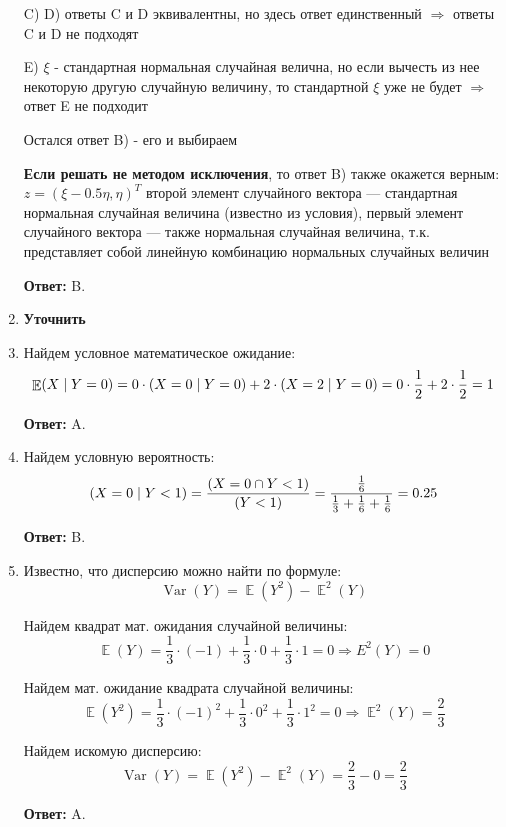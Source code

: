 \documentclass[a4paper]{article} %
\DeclareMathOperator{\Var}{Var}
\DeclareMathOperator{\E}{\mathbb{E}}
\let\P\relax
\DeclareMathOperator{\P}{\mathbb{P}}
\begin{document}
\begin{enumerate}
    C) D)  ответы C и D эквивалентны, но здесь ответ единственный  $\Rightarrow$ ответы C и D не подходят
    
    E) $\xi$ - стандартная нормальная случайная велична, но если вычесть из нее некоторую другую случайную величину, то стандартной $\xi$ уже не будет $\Rightarrow$ ответ E не подходит
    
    Остался ответ B) - его и выбираем
    
    \textbf{Если решать не методом исключения}, то ответ B) также окажется верным:
    $z = (\xi-0.5\eta, \eta)^T$ второй элемент случайного вектора — стандартная нормальная случайная величина (известно из условия), первый элемент случайного вектора — также нормальная случайная величина, т.к. представляет собой линейную комбинацию нормальных случайных величин
    
    \textbf{Ответ:} B.
    
    
    \item
    \textbf{Уточнить}

    
    \item
    Найдем условное математическое ожидание:
    \[\E(X \mid Y=0) = 0 \cdot \P(X=0 \mid Y=0) + 2 \cdot \P(X=2 \mid Y=0) = 0 \cdot \frac{1}{2} + 2 \cdot \frac{1}{2} = 1\]
    
    \textbf{Ответ:} A.
    
    
    \item
    Найдем условную вероятность:
    \[\P(X=0 \mid Y<1) = \frac{\P(X=0 \cap Y<1)}{\P(Y<1)} = \frac{\frac{1}{6}}{\frac{1}{3}+\frac{1}{6}+\frac{1}{6}} = 0.25\]
    
    \textbf{Ответ:} B.
    
    
    \item
    Известно, что дисперсию можно найти по формуле:
    \[\Var(Y) = \E(Y^2) - \E^2(Y)\]
    
    Найдем квадрат мат. ожидания случайной величины:
    \[\E(Y) = \frac{1}{3} \cdot (-1) + \frac{1}{3} \cdot 0 + \frac{1}{3} \cdot 1 = 0 \Rightarrow E^2(Y)=0\]
    
    Найдем мат. ожидание квадрата случайной величины:
    \[\E(Y^2) = \frac{1}{3} \cdot (-1)^2 + \frac{1}{3} \cdot 0^2 + \frac{1}{3} \cdot 1^2 = 0 \Rightarrow \E^2(Y)= \frac{2}{3}\]
    
    Найдем искомую дисперсию:
    \[\Var(Y) = \E(Y^2) - \E^2(Y) = \frac{2}{3} - 0 = \frac{2}{3}\]
    
    \textbf{Ответ:} A.
    

\end{enumerate}
\end{document}
